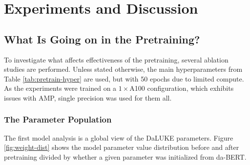 \documentclass[main.tex]{subfiles}
\begin{document}
\chapter{Experiments and Discussion}
\label{chap:discussion}

\section{What Is Going on in the Pretraining?}
\label{sec:pretrainpls}
To investigate what affects effectiveness of the pretraining, several ablation studies are performed.
Unless stated otherwise, the main hyperparameters from Table \ref{tab:pretrain-hyper} are used, but with 50 epochs due to limited compute.
As the experiments were trained on a $ 1\times$A100 configuration, which exhibits issues with AMP, single precision was used for them all.

\subsection{The Parameter Population}
The first model analysis is a global view of the DaLUKE parameters.
Figure \ref{fig:weight-dist} shows the model parameter value distribution before and after pretraining divided by whether a given parameter was initialized from da-BERT.
\end{document}
